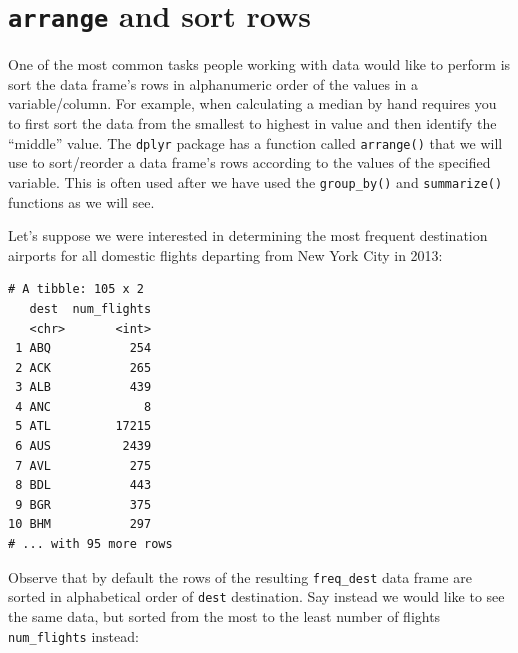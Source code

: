 \documentclass[12pt, krantz2,]{krantz}
\makeatletter
\newenvironment{Shaded}{\begin{snugshade}}{\end{snugshade}}
\newcommand{\DataTypeTok}[1]{\textcolor[rgb]{0.27,0.27,0.27}{#1}}
\newcommand{\KeywordTok}[1]{\textcolor[rgb]{0.27,0.27,0.27}{\textbf{#1}}}
\newcommand{\NormalTok}[1]{#1}
\newcommand{\OperatorTok}[1]{\textcolor[rgb]{0.43,0.43,0.43}{\textbf{#1}}}
\newcommand{\StringTok}[1]{\textcolor[rgb]{0.5,0.5,0.5}{#1}}
\newenvironment{kframe}{%
\medskip{}
\setlength{\fboxsep}{.8em}
 \def\at@end@of@kframe{}%
 \ifinner\ifhmode%
  \def\at@end@of@kframe{\end{minipage}}%
  \begin{minipage}{\columnwidth}%
 \fi\fi%
 \def\FrameCommand##1{\hskip\@totalleftmargin \hskip-\fboxsep
 \colorbox{shadecolor}{##1}\hskip-\fboxsep
     \hskip-\linewidth \hskip-\@totalleftmargin \hskip\columnwidth}%
 \MakeFramed {\advance\hsize-\width
   \@totalleftmargin\z@ \linewidth\hsize
   \@setminipage}}%
 {\par\unskip\endMakeFramed%
 \at@end@of@kframe}
\renewenvironment{Shaded}{\begin{kframe}}{\end{kframe}}
\makeatother
\begin{document}
\hypertarget{arrange}{%
\section{\texorpdfstring{\texttt{arrange} and sort rows}{arrange and sort rows}}\label{arrange}}

One of the most common tasks people working with data would like to perform is sort the data frame's rows in alphanumeric order of the values in a variable/column. For example, when calculating a median by hand requires you to first sort the data from the smallest to highest in value and then identify the ``middle'' value. The \texttt{dplyr} package has a function called \texttt{arrange()} that we will use to sort/reorder a data frame's rows according to the values of the specified variable. This is often used after we have used the \texttt{group\_by()} and \texttt{summarize()} functions as we will see.

Let's suppose we were interested in determining the most frequent destination airports for all domestic flights departing from New York City in 2013:

\begin{Shaded}
\end{Shaded}

\begin{verbatim}
# A tibble: 105 x 2
   dest  num_flights
   <chr>       <int>
 1 ABQ           254
 2 ACK           265
 3 ALB           439
 4 ANC             8
 5 ATL         17215
 6 AUS          2439
 7 AVL           275
 8 BDL           443
 9 BGR           375
10 BHM           297
# ... with 95 more rows
\end{verbatim}

Observe that by default the rows of the resulting \texttt{freq\_dest} data frame are sorted in alphabetical order of \texttt{dest} destination. Say instead we would like to see the same data, but sorted from the most to the least number of flights \texttt{num\_flights} instead:

\begin{Shaded}
\end{Shaded}
\end{document}

